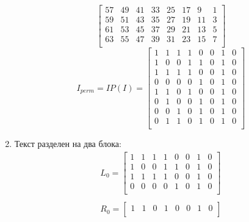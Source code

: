 \documentclass[a4paper, 14pt]{extarticle}
\begin{document}
\begin{enumerate}
\begin{equation}
\begin{bmatrix}
            57  & 49  & 41  & 33  & 25  & 17  & 9   & 1   \\
            59  & 51  & 43  & 35  & 27  & 19  & 11  & 3   \\
            61  & 53  & 45  & 37  & 29  & 21  & 13  & 5   \\
            63  & 55  & 47  & 39  & 31  & 23  & 15  & 7   \\
        \end{bmatrix}
    \end{equation}
    \begin{equation}
        I_{perm} = IP(I) = \begin{bmatrix}
            1   & 1   & 1   & 1   & 0   & 0   & 1   & 0   \\
            1   & 0   & 0   & 1   & 1   & 0   & 1   & 0   \\
            1   & 1   & 1   & 1   & 0   & 0   & 1   & 0   \\
            0   & 0   & 0   & 0   & 1   & 0   & 1   & 0   \\
            1   & 1   & 0   & 1   & 0   & 0   & 1   & 0   \\
            0   & 1   & 0   & 0   & 1   & 0   & 1   & 0   \\
            0   & 0   & 1   & 0   & 1   & 0   & 1   & 0   \\
            0   & 1   & 1   & 0   & 1   & 0   & 1   & 0   \\
        \end{bmatrix}
    \end{equation}
    \item Текст разделен на два блока:
    \begin{equation}
        \begin{array}{c}
            L_0 = \begin{bmatrix}
                1   & 1   & 1   & 1   & 0   & 0   & 1   & 0   \\
                1   & 0   & 0   & 1   & 1   & 0   & 1   & 0   \\
                1   & 1   & 1   & 1   & 0   & 0   & 1   & 0   \\
                0   & 0   & 0   & 0   & 1   & 0   & 1   & 0   \\
            \end{bmatrix}\\
            \\
            R_0 = \begin{bmatrix}
                1   & 1   & 0   & 1   & 0   & 0   & 1   & 0   \\

\end{bmatrix}
\end{array}
\end{equation}
\end{enumerate}
\end{document}

